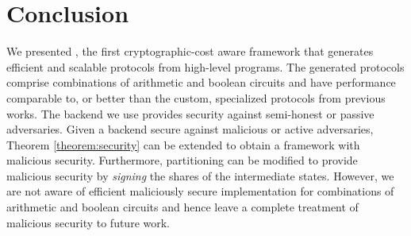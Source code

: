 \section{Conclusion}
\label{sec:conclude}
We presented \tool, the first
cryptographic-cost aware framework that generates efficient and
scalable \mpc protocols from high-level programs.
The generated protocols comprise combinations
of arithmetic and boolean circuits and have performance comparable to, or better than the custom, specialized
protocols from previous works.
The \mpc backend we use provides security against semi-honest or passive adversaries.
Given a \mpc backend secure against malicious or active adversaries, Theorem \ref{theorem:security} 
can be extended to obtain a framework with malicious security. Furthermore,  
partitioning can be modified to provide malicious security by {\it signing} the shares of the intermediate states. However, we are not aware of efficient maliciously secure \mpc implementation for combinations of
arithmetic and boolean circuits and hence leave a complete treatment of malicious security to future work.
